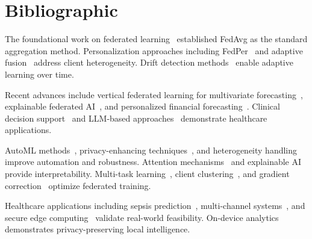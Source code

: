 \documentclass[11pt, a4paper]{article}
\begin{document}
\vspace{0.3cm}
\section*{Bibliographic}

The foundational work on federated learning~\cite{mcmahan2017} established FedAvg as the standard aggregation method. Personalization approaches including FedPer~\cite{arivazhagan2020} and adaptive fusion~\cite{bernardi2023adaptive} address client heterogeneity. Drift detection methods~\cite{jothimurugesan2022} enable adaptive learning over time.

Recent advances include vertical federated learning for multivariate forecasting~\cite{yang2025mvfl}, explainable federated AI~\cite{kalakoti2025fedxai}, and personalized financial forecasting~\cite{noseda2025financial,wang2025personalized}. Clinical decision support~\cite{karamanlioglu2025clinical} and LLM-based approaches~\cite{abdelsater2024llama} demonstrate healthcare applications.

AutoML methods~\cite{maher2025automl}, privacy-enhancing techniques~\cite{gupta2025privacy}, and heterogeneity handling~\cite{yuan2024trend,tang2025horizon} improve automation and robustness. Attention mechanisms~\cite{larocca2021attention} and explainable AI~\cite{larocca2022shap} provide interpretability. Multi-task learning~\cite{zhang2022multitask}, client clustering~\cite{amato2023clustering}, and gradient correction~\cite{liu2022} optimize federated training.

Healthcare applications including sepsis prediction~\cite{dusing2025sepsis,qayyum2023fedsepsis,lei2025supervised}, multi-channel systems~\cite{pan2025multiprog}, and secure edge computing~\cite{maurya2025secure} validate real-world feasibility. On-device analytics~\cite{churaev2023} demonstrates privacy-preserving local intelligence.



\end{document}
